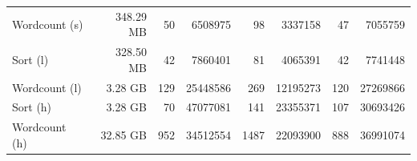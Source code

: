 \documentclass[review]{elsarticle}
\begin{document}
\begin{table}[b]
\begin{tabular}{ l r r r r r r r }
		Wordcount (s) & 348.29 MB & 50 & 6508975 & 98 & 3337158 & 47 & 7055759 \\
		Sort (l) & 328.50 MB & 42 & 7860401 & 81 & 4065391 & 42 & 7741448 \\
		Wordcount (l) & 3.28 GB & 129 & 25448586 & 269 & 12195273 & 120 & 27269866 \\
		Sort (h) & 3.28 GB & 70 & 47077081 & 141 & 23355371 & 107 & 30693426 \\
		Wordcount (h) & 32.85 GB & 952 & 34512554 & 1487 & 22093900 & 888 & 36991074 \\

\end{tabular}
\end{table}
\end{document}

